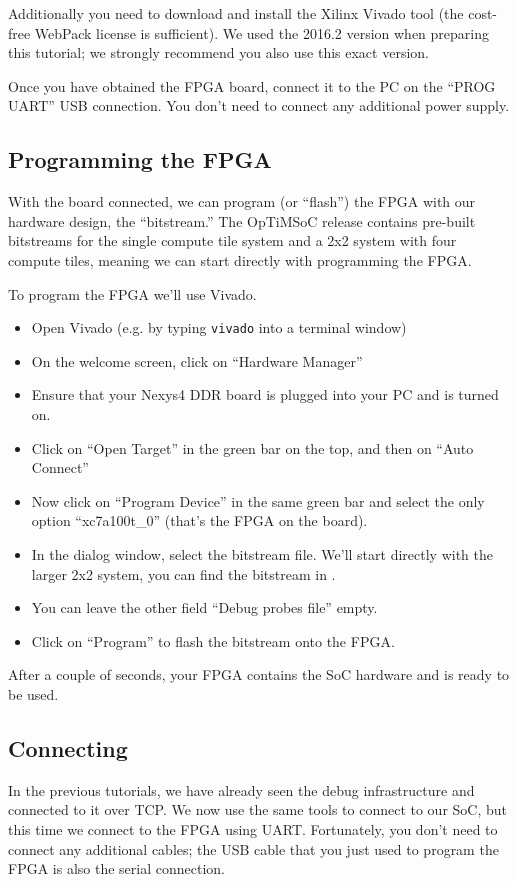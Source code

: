Additionally you need to download and install the Xilinx Vivado tool (the cost-free WebPack license is sufficient).
We used the 2016.2 version when preparing this tutorial; we strongly recommend you also use this exact version.

Once you have obtained the FPGA board, connect it to the PC on the ``PROG UART'' USB connection.
You don't need to connect any additional power supply.

\subsection{Programming the FPGA}
With the board connected, we can program (or ``flash'') the FPGA with our hardware design, the ``bitstream.''
The OpTiMSoC release contains pre-built bitstreams for the single compute tile system and a 2x2 system with four compute tiles, meaning we can start directly with programming the FPGA.

To program the FPGA we'll use Vivado.
\begin{itemize}
 \item Open Vivado (e.g. by typing \verb|vivado| into a terminal window)
 \item On the welcome screen, click on ``Hardware Manager''
 \item Ensure that your Nexys4 DDR board is plugged into your PC and is turned on.
 \item Click on ``Open Target'' in the green bar on the top, and then on ``Auto Connect''
 \item Now click on ``Program Device'' in the same green bar and select the only option ``xc7a100t\_0'' (that's the FPGA on the board).
 \item In the dialog window, select the bitstream file. We'll start directly with the larger 2x2 system, you can find the bitstream in
   .
 \item You can leave the other field ``Debug probes file'' empty.
 \item Click on ``Program'' to flash the bitstream onto the FPGA.
\end{itemize}

After a couple of seconds, your FPGA contains the SoC hardware and is ready to be used.


\subsection{Connecting}
In the previous tutorials, we have already seen the debug infrastructure and connected to it over TCP.
We now use the same tools to connect to our SoC, but this time we connect to the FPGA using UART.
Fortunately, you don't need to connect any additional cables; the USB cable that you just used to program the FPGA is also the serial connection.

